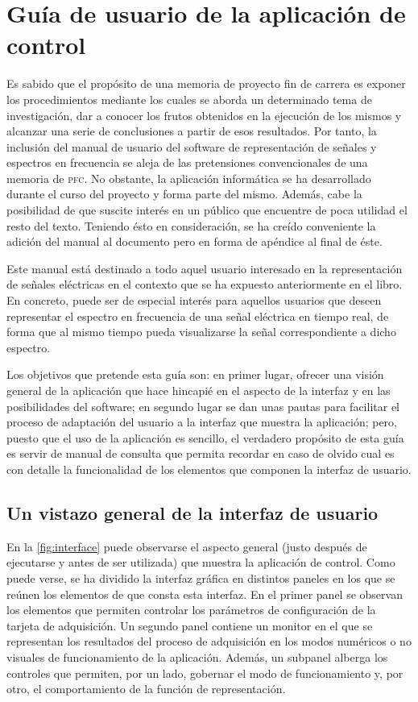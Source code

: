 \chapter{Guía de usuario de la aplicación de control}\label{chap:appendixA}

Es sabido que el propósito de una memoria de proyecto fin de carrera es
exponer los procedimientos mediante los cuales se aborda un determinado
tema de investigación, dar a conocer los frutos obtenidos en la ejecución
de los mismos y alcanzar una serie de conclusiones a partir de esos
resultados. Por tanto, la inclusión del manual de usuario del software de
representación de señales y espectros en frecuencia se aleja de las
pretensiones convencionales de una memoria de \textsc{pfc}. No obstante, la
aplicación informática se ha desarrollado durante el curso del proyecto y
forma parte del mismo. Además, cabe la posibilidad de que suscite interés
en un público que encuentre de poca utilidad el resto del texto. Teniendo
ésto en consideración, se ha creído conveniente la adición del manual al
documento pero en forma de apéndice al final de éste.

Este manual está destinado a todo aquel usuario interesado en la
representación de señales eléctricas en el contexto que se ha expuesto
anteriormente en el libro. En concreto, puede ser de especial interés para
aquellos usuarios que deseen representar el espectro en frecuencia de una
señal eléctrica en tiempo real, de forma que al mismo tiempo pueda
visualizarse la señal correspondiente a dicho espectro.

Los objetivos que pretende esta guía son: en primer lugar, ofrecer una
visión general de la aplicación que hace hincapié en el aspecto de la
interfaz y en las posibilidades del software; en segundo lugar se dan unas
pautas para facilitar el proceso de adaptación del usuario a la interfaz
que muestra la aplicación; pero, puesto que el uso de la aplicación es
sencillo, el verdadero propósito de esta guía es servir de manual de
consulta que permita recordar en caso de olvido cual es con detalle la
funcionalidad de los elementos que componen la interfaz de usuario.


\section{Un vistazo general de la interfaz de usuario}

En la \vref{fig:interface} puede observarse el aspecto general (justo
después de ejecutarse y antes de ser utilizada) que muestra la aplicación
de control. Como puede verse, se ha dividido la interfaz gráfica en
distintos paneles en los que se reúnen los elementos de que consta esta
interfaz. En el primer panel se observan los elementos que permiten
controlar los parámetros de configuración de la tarjeta de adquisición. Un
segundo panel contiene un monitor en el que se representan los resultados
del proceso de adquisición en los modos numéricos o no visuales de
funcionamiento de la aplicación. Además, un subpanel alberga los controles
que permiten, por un lado, gobernar el modo de funcionamiento y, por otro,
el comportamiento de la función de representación.

